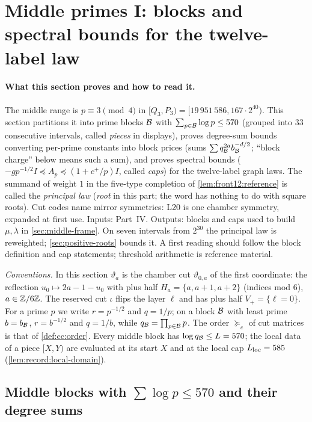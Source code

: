 
\section{Middle primes I: blocks and spectral bounds for the twelve-label law}
\label{sec:middle-reference}

\paragraph{What this section proves and how to read it.}
The middle range is $p\equiv3\pmod4$ in
$[Q_3,P_3)=[19\,951\,586,167\cdot2^{40})$. This section partitions
it into prime blocks $\mathcal B$ with $\sum_{p\in\mathcal B}\log p\le570$
(grouped into $33$ consecutive intervals, called \emph{pieces} in
displays), proves degree-sum bounds converting per-prime constants
into block prices (sums $\sum q_{\mathcal B}^{2a}b_{\mathcal B}^{-d/2}$; ``block
charge'' below means such a sum), and proves spectral bounds
($-gp^{-1/2}I\preceq A_p\preceq(1+c^+/p)I$, called \emph{caps}) for
the twelve-label graph laws. The summand of weight $1$ in the five-type
completion of \cref{lem:front12:reference} is called the \emph{principal law} (\emph{root} in this part; the word has
nothing to do with square roots). Cut codes name mirror symmetries:
L20 is one chamber symmetry, expanded at first use. Inputs: Part~IV.
Outputs: blocks and caps used to build $\mu,\lambda$ in
\cref{sec:middle-frame}. On seven intervals from $2^{30}$ the
principal law is reweighted; \cref{sec:positive-roots} bounds it.
A first reading should follow the block definition and cap
statements; threshold arithmetic is reference material.

\emph{Conventions.} In this section $\vartheta_a$ is the chamber cut
$\vartheta_{0,a}$ of the first coordinate: the reflection
$u_0\mapsto2a-1-u_0$ with plus half $H_a=\{a,a+1,a+2\}$ (indices mod $6$),
$a\in\mathbb Z/6\mathbb Z$. The reserved cut $\iota$ flips the layer $\ell$ and has plus
half $V_+=\{\ell=0\}$. For a prime $p$ we write $r=p^{-1/2}$ and $q=1/p$; on a
block $\mathcal B$ with least prime $b=b_{\mathcal B}$, $r=b^{-1/2}$ and $q=1/b$, while
$q_{\mathcal B}=\prod_{p\in\mathcal B}p$. The order $\succeq_c$ of cut matrices is that of
\cref{def:cc:order}. Every middle block has $\log q_{\mathcal B}\le L=570$; the
local data of a piece $[X,Y)$ are evaluated at its start $X$ and at the
local cap $L_{\rm loc}=585$ (\cref{lem:record:local-domain}).

\subsection{Middle blocks with \texorpdfstring{$\sum\log p\le570$}{sum log p <= 570} and their degree sums}
\label{subsec:record:middle_blocks}

